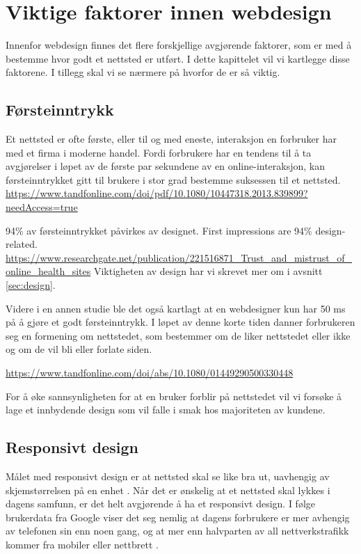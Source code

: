 

\section{Viktige faktorer innen webdesign}
\label{sec:viktige-faktorer}
Innenfor webdesign finnes det flere forskjellige avgjørende faktorer, som er med å bestemme hvor godt et nettsted er utført. I dette kapittelet vil vi kartlegge disse faktorene. I tillegg skal vi se nærmere på hvorfor de er så viktig.


\subsection{Førsteinntrykk}
Et nettsted er ofte første, eller til og med eneste, interaksjon en forbruker har med et firma i moderne handel. Fordi forbrukere har en tendens til å ta avgjørelser i løpet av de første par sekundene av en online-interaksjon, kan førsteinntrykket gitt til brukere i stor grad bestemme suksessen til et nettsted. \url{https://www.tandfonline.com/doi/pdf/10.1080/10447318.2013.839899?needAccess=true }

94\% av førsteinntrykket påvirkes av designet. 
First impressions are 94\% design-related. \url{https://www.researchgate.net/publication/221516871_Trust_and_mistrust_of_online_health_sites}
Viktigheten av design har vi skrevet mer om i avsnitt \ref{sec:design}.


Videre i en annen studie \cite{} ble det også kartlagt at en webdesigner kun har 50 ms på å gjøre et godt førsteinntrykk.
I løpet av denne korte tiden danner forbrukeren seg en formening om nettstedet, som bestemmer om de liker nettstedet  eller ikke og om de vil bli eller forlate siden.

\url{https://www.tandfonline.com/doi/abs/10.1080/01449290500330448}

For å øke sannsynligheten for at en bruker forblir på nettstedet vil vi forsøke å lage et innbydende design som vil falle i smak hos majoriteten av kundene.


\subsection{Responsivt design}
Målet med responsivt design er at nettsted skal se like bra ut, uavhengig av skjemstørrelsen på en enhet \cite{kim2013rwd}. Når det er ønskelig at et nettsted skal lykkes i dagens samfunn, er det helt avgjørende å ha et responsivt design.  I følge brukerdata fra Google viser det seg nemlig at dagens forbrukere er mer avhengig av telefonen sin enn noen gang, og at mer enn halvparten av all nettverkstrafikk kommer fra mobiler eller nettbrett \cite{google16hms}. 

